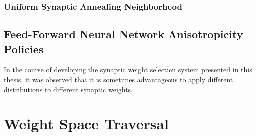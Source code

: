 \documentclass[11pt]{afthesis}
\begin{document}
	\subsubsection{Uniform Synaptic Annealing Neighborhood}

	
	
	
	\subsection{Feed-Forward Neural Network Anisotropicity Policies}
	\label{scn:ffnn_anisotropicity}
	In the course of developing the synaptic weight selection system presented in this thesis, it was observed that it is sometimes advantageous to apply different distributions to different synaptic weights. 
	
	
	
	
	\section{Weight Space Traversal}
	
\end{document}
